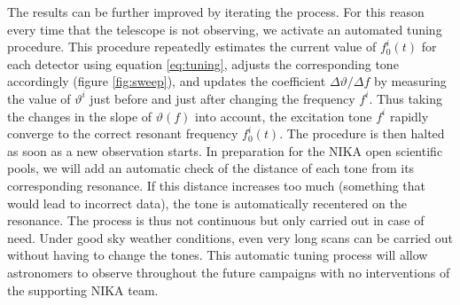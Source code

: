The results can be further improved by iterating the process. For this reason
every time that the telescope is not observing, we activate an automated tuning
procedure. This procedure repeatedly estimates the current value of $f_0^i(t)$
for each detector using equation \ref{eq:tuning}, adjusts the corresponding
tone accordingly (figure \ref{fig:sweep}), and updates the coefficient
$\Delta\vartheta/\Delta f$ by measuring the value of $\vartheta^i$ just before and
just after changing the frequency $f^i$. Thus taking the changes
in the slope of $\vartheta(f)$ into account, the excitation tone $f^i$ rapidly
converge to the correct resonant frequency $f_0^i(t)$. The procedure is then
halted as soon as a new observation starts.
In preparation for the NIKA open scientific pools, we will add an automatic check of the distance of each tone from its corresponding resonance. If this distance increases too much (something that would lead to incorrect data), the tone is automatically recentered on the resonance. The process is thus not continuous but only carried out in case of need. Under good sky weather conditions, even very long scans can be carried out without having to change the tones. This automatic tuning process will allow astronomers to observe throughout the future campaigns with no interventions of the supporting NIKA team.
